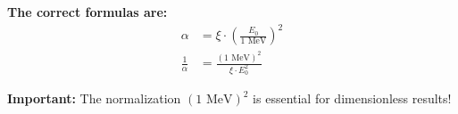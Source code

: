 \documentclass[12pt,a4paper]{article}
\theoremstyle{definition}
\begin{document}
	\begin{tcolorbox}[colback=blue!5!white,colframe=blue!75!black]
		\textbf{The correct formulas are:}
		\begin{align*}
			\alpha &= \xi \cdot \left(\frac{E_0}{1 \text{ MeV}}\right)^2 \\
			\frac{1}{\alpha} &= \frac{(1 \text{ MeV})^2}{\xi \cdot E_0^2}
		\end{align*}
	\end{tcolorbox}
	
	\begin{tcolorbox}[colback=red!5!white,colframe=red!75!black]
		\textbf{Important:} The normalization $(1 \text{ MeV})^2$ is essential for dimensionless results!
	\end{tcolorbox}
	
	
\end{document}

